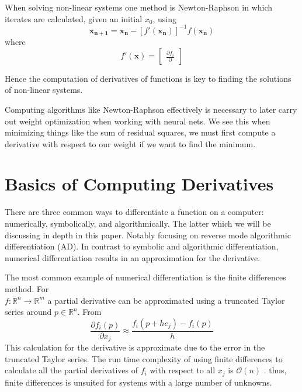 \documentclass{article}
\begin{document}
When solving non-linear systems one method is Newton-Raphson in which iterates are calculated, given an initial $x_0$, using
\begin{equation}
\mathbf{x_{n+1}} = \mathbf{x_n} - [f'(\mathbf{x_n})]^{-1}f(\mathbf{x_n})
\end{equation}
where
\begin{equation}
    f'(\mathbf{x}) = \begin{bmatrix}
        \frac{\partial f_i}{\partial }
    \end{bmatrix}
\end{equation}
 
Hence the computation of derivatives of functions is key to finding the solutions of non-linear systems.

Computing algorithms like Newton-Raphson effectively is necessary to later carry out weight optimization when working with neural nets. We see this when minimizing things like the sum of residual squares, we must first compute a derivative with respect to our weight if we want to find the minimum.

\section{Basics of Computing Derivatives}

There are three common ways to differentiate a function on a computer: numerically, symbolically, and algorithmically. The latter which we will be discussing in depth in this paper. Notably focusing on reverse mode algorithmic differentiation (AD). In contrast to symbolic and algorithmic differentiation, numerical differentiation results in an approximation for the derivative.

The most common example of numerical differentiation is the finite differences method. For \\ $f: \mathbb{R}^n \longrightarrow \mathbb{R}^m$ a partial derivative can be approximated using a truncated Taylor series around $p \in \mathbb{R}^n$. From \cite{chem}
\begin{equation*}
    \frac{\partial f_i (p)}{\partial x_j} \approx \frac{f_i(p+he_j) - f_i(p)}{h}
\end{equation*}
This calculation for the derivative is approximate due to the error in the truncated Taylor series. The run time complexity of using finite differences to calculate all the partial derivatives of $f_i$ with respect to all $x_j$ is $\mathcal{O}(n)$ \cite{dhamarticle}. thus, finite differences is unsuited for systems with a large number of unknowns.
\end{document}
